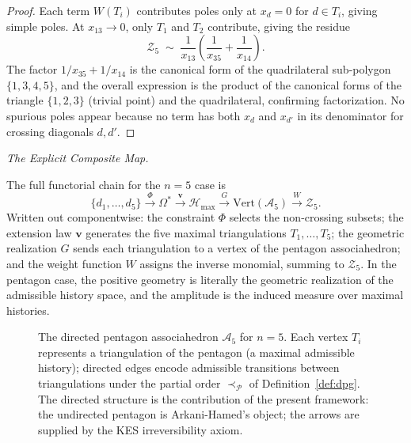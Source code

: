 \documentclass[11pt]{article}
\theoremstyle{plain}
\theoremstyle{definition}
\theoremstyle{remark}
\newcommand{\Phif}{\Phi}
\newcommand{\OmKS}{\Omega}
\newcommand{\Hmax}{\mathcal{H}_{\max}}
\begin{document}
\begin{proof}
Each term $W(T_i)$ contributes poles only at $x_d = 0$ for $d \in T_i$, giving simple poles. At $x_{13} \to 0$, only $T_1$ and $T_2$ contribute, giving the residue
\[
  \mathcal{Z}_5 \;\sim\; \frac{1}{x_{13}} \left(\frac{1}{x_{35}} + \frac{1}{x_{14}}\right).
\]
The factor $1/x_{35} + 1/x_{14}$ is the canonical form of the quadrilateral sub-polygon $\{1,3,4,5\}$, and the overall expression is the product of the canonical forms of the triangle $\{1,2,3\}$ (trivial point) and the quadrilateral, confirming factorization. No spurious poles appear because no term has both $x_d$ and $x_{d'}$ in its denominator for crossing diagonals $d, d'$.
\end{proof}

\medskip\noindent\textit{The Explicit Composite Map.}

The full functorial chain for the $n=5$ case is
\begin{equation}
\label{eq:composite-map}
  \{d_1,\ldots,d_5\} \xrightarrow{\Phif} \OmKS^* \xrightarrow{\mathbf{v}} \Hmax \xrightarrow{G} \mathrm{Vert}(\mathcal{A}_5) \xrightarrow{W} \mathcal{Z}_5.
\end{equation}
Written out componentwise: the constraint $\Phif$ selects the non-crossing subsets; the extension law $\mathbf{v}$ generates the five maximal triangulations $T_1, \ldots, T_5$; the geometric realization $G$ sends each triangulation to a vertex of the pentagon associahedron; and the weight function $W$ assigns the inverse monomial, summing to $\mathcal{Z}_5$. In the pentagon case, the positive geometry is literally the geometric realization of the admissible history space, and the amplitude is the induced measure over maximal histories.

\begin{figure}[H]
\centering
{}
\caption{The directed pentagon associahedron $\mathcal{A}_5$ for $n=5$.
Each vertex $T_i$ represents a triangulation of the pentagon (a maximal
admissible history); directed edges encode admissible transitions
between triangulations under the partial order $\prec_{\mathcal{P}}$
of Definition~\ref{def:dpg}. The directed structure is the contribution
of the present framework: the undirected pentagon is Arkani-Hamed's
object; the arrows are supplied by the KES irreversibility axiom.}
\end{figure}
\end{document}
